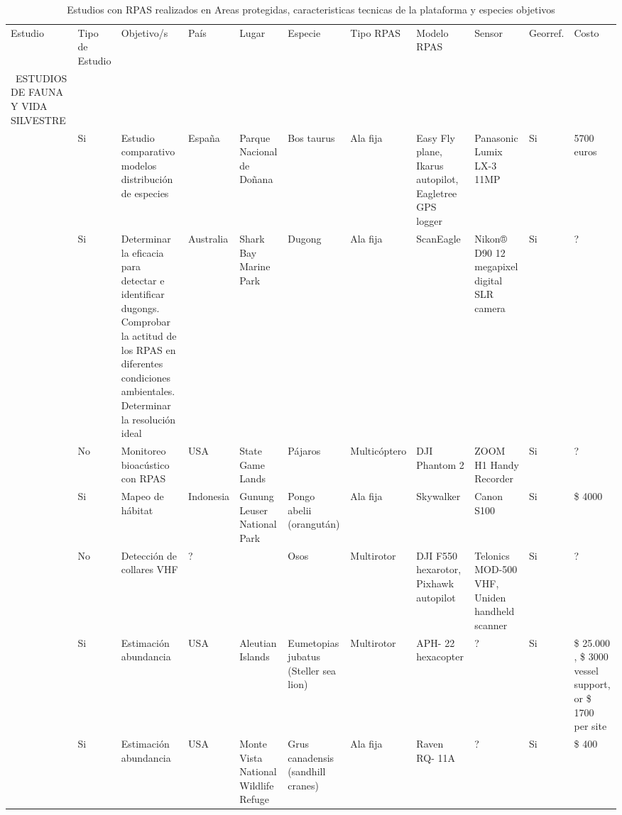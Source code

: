 \documentclass[9t,twocolumn]{article}
\begin{document}
\begin{sidewaystable}
\centering
\captionsetup{font=scriptsize,labelfont=scriptsize}
\caption{Estudios con RPAS realizados en Areas protegidas, caracteristicas tecnicas de la plataforma y especies objetivos}
\label{my-label}
\tiny
\begin{tabular}{p{2.5cm}p{1cm}p{3cm}p{1cm}p{2cm}p{2cm}p{1cm}p{2cm}p{2cm}p{1cm}p{0.5cm}}
\cmidrule(r){1-11}

Estudio & Tipo de Estudio & Objetivo/s & País & Lugar & Especie & Tipo RPAS & Modelo RPAS & Sensor & Georref. & Costo \\ \cmidrule(r){1-11}

\ ESTUDIOS DE FAUNA Y VIDA SILVESTRE \\ 


\cite{PazmanyMulero2015}  & Si & Estudio comparativo modelos distribución de especies & España & Parque Nacional de Doñana & Bos taurus  & Ala fija & Easy Fly plane, Ikarus autopilot, Eagletree GPS logger & Panasonic Lumix LX-3 11MP & Si & 
5700 euros \\ 

\citealt{Hodgson2013} & Si & Determinar la eficacia para detectar e identificar dugongs.  Comprobar la actitud de los RPAS en diferentes condiciones ambientales. Determinar la resolución ideal  & Australia & Shark Bay Marine Park & Dugong & Ala fija &  ScanEagle & Nikon® D90 12 megapixel digital SLR camera  & Si & ?  \\ 


\cite{Wilson2017}  & No & Monitoreo bioacústico con RPAS & USA & State Game Lands & Pájaros  & Multicóptero & DJI Phantom 2 & ZOOM H1 Handy Recorder  & Si & ? \\ 

\cite{Szantoi2017}  & Si & Mapeo de hábitat & Indonesia & Gunung Leuser National Park & Pongo abelii (orangután)  & Ala fija & Skywalker & Canon S100  & Si & \$ 4000 \\ 


\cite{Bayram2016}  &  No & Detección de collares VHF & ? & & Osos  & Multirotor & DJI F550 hexarotor, Pixhawk autopilot & Telonics MOD-500 VHF, Uniden handheld scanner  & Si & ? \\ 

\cite{Christie2016}  &  Si  & Estimación abundancia & USA &  Aleutian Islands & Eumetopias jubatus (Steller sea lion)  & Multirotor & APH- 22 hexacopter & ?  & Si & \$ 25.000 , \$ 3000 vessel support, or \$ 1700 per site \\ 

\cite{Christie2016}  &  Si & Estimación abundancia & USA &  Monte Vista National Wildlife Refuge
 & Grus canadensis (sandhill cranes)  & Ala fija & Raven RQ- 11A & ?  & Si & \$ 400 \\ 

\end{tabular}
\end{sidewaystable}
\end{document}
